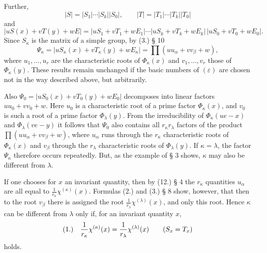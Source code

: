 \documentclass[11pt]{article}
\newcommand{\eps}{\varepsilon}
\newcommand{\fnum}[1]{\textup{(\ensuremath{#1}.)}\quad}
\begin{document}
Further,
\[
 |S|=|S_1|\cdots|S_k||S_0|,
 \qquad
 |T|=|T_1|\cdots|T_k||T_0|
\]
and
\[
 |uS(x)+vT(y)+wE|=|uS_1+vT_1+wE_1|\cdots|uS_k+vT_k+wE_k|\,|uS_0+vT_0+wE_0|.
\]
Since $S_\kappa$ is the matrix of a simple group, by (3.) § 10
\[
 \Psi_\kappa=|uS_\kappa(x)+vT_\kappa(y)+wE_\kappa|
 =\prod(uu_\alpha+vv_\beta+w),
\]
where $u_1,\ldots,u_r$ are the characteristic roots of $\Phi_\kappa(x)$ and $v_1,\ldots,v_r$ those of $\Phi_\kappa(y)$. These results remain unchanged if the basic numbers of $(\eps)$ are chosen not in the way described above, but arbitrarily.

Also $\Psi_0=|uS_0(x)+vT_0(y)+wE_0|$ decomposes into linear factors $uu_0+vv_0+w$. Here $u_0$ is a characteristic root of a prime factor $\Phi_\kappa(x)$, and $v_0$ is such a root of a prime factor $\Phi_\lambda(y)$. From the irreducibility of $\Phi_\kappa(ue-x)$ and $\Phi_\lambda(ve-y)$ it follows that $\Psi_0$ also contains all $r_\kappa r_\lambda$ factors of the product $\prod(uu_\alpha+vv_\beta+w)$, where $u_\alpha$ runs through the $r_\kappa$ characteristic roots of $\Phi_\kappa(x)$ and $v_\beta$ through the $r_\lambda$ characteristic roots of $\Phi_\lambda(y)$. If $\kappa=\lambda$, the factor $\Psi_\kappa$ therefore occurs repeatedly. But, as the example of § 3 shows, $\kappa$ may also be different from $\lambda$.

If one chooses for $x$ an invariant quantity, then by (12.) § 4 the $r_\kappa$ quantities $u_\alpha$ are all equal to $\frac1{r_\kappa}\chi^{(\kappa)}(x)$. Formulas (2.) and (3.) § 8 show, however, that then to the root $v_\beta$ there is assigned the root $\frac1{r_\lambda}\chi^{(\lambda)}(x)$, and only this root. Hence $\kappa$ can be different from $\lambda$ only if, for an invariant quantity $x$,
\[
\fnum{1} \frac1{r_\kappa}\chi^{(\kappa)}(x)=\frac1{r_\lambda}\chi^{(\lambda)}(x)\qquad(S_x=T_x)
\]
holds.
\end{document}
